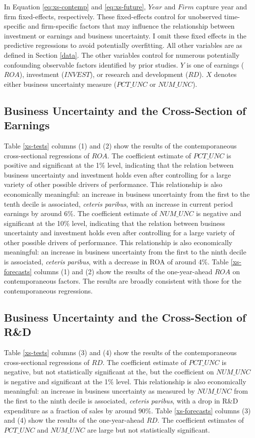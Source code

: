 \documentclass[12pt, letterpaper]{article}
\begin{document}
In Equation \ref{eq:xs-contemp} and \ref{eq:xs-future}, $Year$ and $Firm$ capture year and firm fixed-effects, respectively.  These fixed-effects control for unobserved time-specific and firm-specific factors that may influence the relationship between investment or earnings and business uncertainty. I omit these fixed effects in the predictive regressions to avoid potentially overfitting. All other variables are as defined in Section \ref{data}. The other variables control for numerous potentially confounding observable factors identified by prior studies. $Y$ is one of earnings ($ROA$), investment ($INVEST$), or research and development ($RD$). $X$ denotes either business uncertainty measure ($PCT\_UNC$ or $NUM\_UNC$). 

\subsection{Business Uncertainty and the Cross-Section of Earnings}
Table \ref{xs-tests} columns (1) and (2) show the results of the contemporaneous cross-sectional regressions of $ROA$. The coefficient estimate of $PCT\_UNC$ is positive and significant at the 1\% level, indicating that the  relation between business uncertainty and investment holds even after controlling for a large variety of other possible drivers of performance. This relationship is also economically meaningful: an increase in business uncertainty from the first to the tenth decile is associated, \emph{ceteris paribus}, with an increase in current period earnings by around 6\%. The coefficient estimate of $NUM\_UNC$ is negative and significant at the 10\% level, indicating that the relation between business uncertainty and investment holds even after controlling for a large variety of other possible drivers of performance. This relationship is also economically meaningful: an increase in business uncertainty from the first to the ninth decile is associated, \emph{ceteris paribus}, with a decrease in ROA of around 4\%. Table \ref{xs-forecasts} columns (1) and (2) show the results of the one-year-ahead $ROA$ on contemporaneous factors. The results are broadly consistent with those for the contemporaneous regressions.

\subsection{Business Uncertainty and the Cross-Section of R\&D}

Table \ref{xs-tests} columns (3) and (4) show the results of the contemporaneous cross-sectional regressions of $RD$. The coefficient estimate of $PCT\_UNC$ is negative, but not statistically significant at the, but the coefficient on $NUM\_UNC$ is negative and significant at the 1\% level. This relationship is also economically meaningful: an increase in business uncertainty as measured by $NUM\_UNC$ from the first to the ninth decile is associated, \emph{ceteris paribus}, with a drop in R\&D expenditure as a fraction of sales by around 90\%. Table \ref{xs-forecasts} columns (3) and (4) show the results of the one-year-ahead $RD$. The coefficient estimates of $PCT\_UNC$ and $NUM\_UNC$ are large but not statistically significant.
\end{document}
